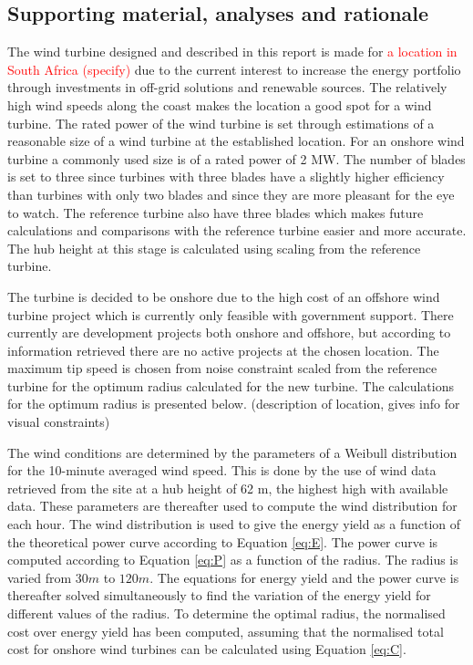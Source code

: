 \subsection{Supporting material, analyses and rationale}

The wind turbine designed and described in this report is made for \textcolor{red}{a location in South Africa (specify)} due to the current interest to increase the energy portfolio through investments in off-grid solutions and renewable sources. The relatively high wind speeds along the coast makes the location a good spot for a wind turbine. The rated power of the wind turbine is set through estimations of a reasonable size of a wind turbine at the established location. For an onshore wind turbine a commonly used size is of a rated power of 2 MW. The number of blades is set to three since turbines with three blades have a slightly higher efficiency than turbines with only two blades and since they are more pleasant for the eye to watch. The reference turbine also have three blades which makes future calculations and comparisons with the reference turbine easier and more accurate. The hub height at this stage is calculated using scaling from the reference turbine.

The turbine is decided to be onshore due to the high cost of an offshore wind turbine project which is currently only feasible with government support. There currently are development projects both onshore and offshore, but according to information retrieved there are no active projects at the chosen location. The maximum tip speed is chosen from noise constraint scaled from the reference turbine for the optimum radius calculated for the new turbine. The calculations for the optimum radius is presented below. (description of location, gives info for visual constraints) 

The wind conditions are determined by the parameters of a Weibull distribution for the 10-minute averaged wind speed. This is done by the use of wind data retrieved from the site at a hub height of 62 m, the highest high with available data. These parameters are thereafter used to compute the wind distribution for each hour. The wind distribution is used to give the energy yield as a function of the theoretical power curve according to Equation \ref{eq:E}. The power curve is computed according to Equation \ref{eq:P} as a function of the radius. The radius is varied from $30 m$ to $120 m$. The equations for energy yield and the power curve is thereafter solved simultaneously to find the variation of the energy yield for different values of the radius. To determine the optimal radius, the normalised cost over energy yield has been computed, assuming that the normalised total cost for onshore wind turbines can be calculated using Equation \ref{eq:C}.

